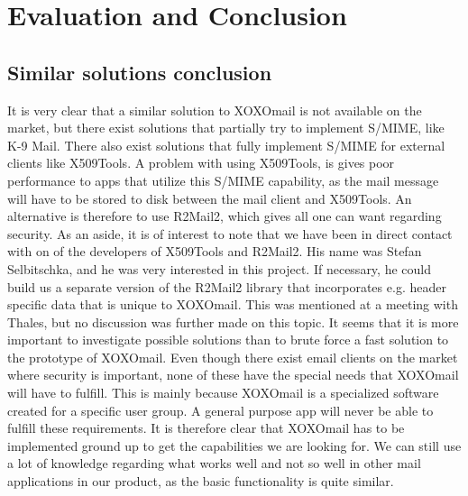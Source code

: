 \section{Evaluation and Conclusion}

\subsection{Similar solutions conclusion}
It is very clear that a similar solution to XOXOmail is not available on the market, but there exist solutions that partially try to implement S/MIME, like K-9 Mail. There also exist solutions that fully implement S/MIME for external clients like X509Tools. A problem with using X509Tools, is gives poor performance to apps that utilize this S/MIME capability, as the mail message will have to be stored to disk between the mail client and X509Tools. An alternative is therefore to use R2Mail2, which gives all one can want regarding security.
\newline
\newline
As an aside, it is of interest to note that we have been in direct contact with on of the developers of X509Tools and R2Mail2. His name was Stefan Selbitschka, and he was very interested in this project. If necessary, he could build us a separate version of the R2Mail2 library that incorporates e.g. header specific data that is unique to XOXOmail. This was mentioned at a meeting with Thales, but no discussion was further made on this topic. It seems that it is more important to investigate possible solutions than to brute force a fast solution to the prototype of XOXOmail.
\newline
\newline
Even though there exist email clients on the market where security is important, none of these have the special needs that XOXOmail will have to fulfill. This is mainly because XOXOmail is a specialized software created for a specific user group. A general purpose app will never be able to fulfill these requirements. It is therefore clear that XOXOmail has to be implemented ground up to get the capabilities we are looking for. We can still use a lot of knowledge regarding what works well and not so well in other mail applications in our product, as the basic functionality is quite similar.

